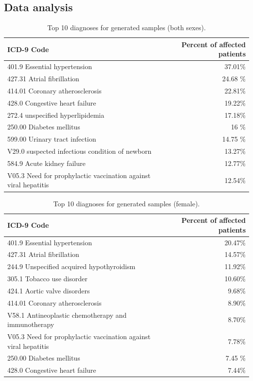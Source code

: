 \documentclass[11pt, a4paper, oneside]{book}
\begin{document}
\subsection{Data analysis}

\begin{table}
\begin{tabular}{l|r}
\textbf{ICD-9 Code} & \textbf{Percent of affected patients}\\
\hline
401.9  Essential hypertension & 37.01\%\\
427.31 Atrial fibrillation & 24.68 \%\\
414.01 Coronary atherosclerosis & 22.81\%\\
428.0 Congestive heart failure & 19.22\%\\
272.4 unspecified hyperlipidemia & 17.18\%\\
250.00 Diabetes mellitus & 16 \%\\
599.00 Urinary tract infection & 14.75 \%\\
V29.0 suspected infectious condition of newborn & 13.27\%\\
584.9 Acute kidney failure & 12.77\%\\
V05.3 Need for prophylactic vaccination against viral hepatitis & 12.54\%\\
\end{tabular}
\caption{\label{tab:top10-icd-mixed}Top 10 diagnoses for generated samples (both sexes).}
\end{table}

\begin{table}
\begin{tabular}{l|r}
\textbf{ICD-9 Code} & \textbf{Percent of affected patients}\\
\hline
401.9  Essential hypertension & 20.47\%\\
427.31 Atrial fibrillation & 14.57\%\\
244.9 Unspecified acquired hypothyroidism & 11.92\%\\
305.1 Tobacco use disorder & 10.60\%\\
424.1 Aortic valve disorders & 9.68\%\\
414.01 Coronary atherosclerosis & 8.90\%\\
V58.1 Antineoplastic chemotherapy and immunotherapy & 8.70\%\\
V05.3 Need for prophylactic vaccination against viral hepatitis & 7.78\%\\
250.00 Diabetes mellitus & 7.45 \%\\
428.0 Congestive heart failure & 7.44\%\\
\end{tabular}
\caption{\label{tab:top10-icd-mixed}Top 10 diagnoses for generated samples (female).}
\end{table}
\end{document}
